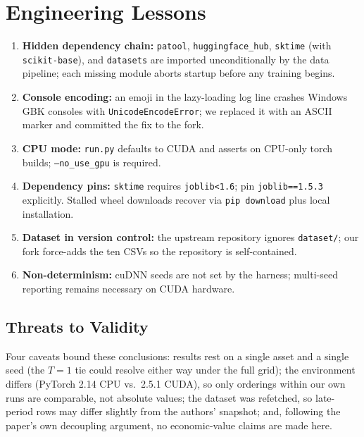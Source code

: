\documentclass[conference]{IEEEtran}
\begin{document}
\section{Engineering Lessons}
\label{sec:lessons}

\begin{enumerate}
  \item \textbf{Hidden dependency chain:} \texttt{patool},
        \texttt{huggingface\_hub}, \texttt{sktime} (with
        \texttt{scikit-base}), and \texttt{datasets} are imported
        unconditionally by the data pipeline; each missing module aborts
        startup before any training begins.
  \item \textbf{Console encoding:} an emoji in the lazy-loading log line
        crashes Windows GBK consoles with \texttt{UnicodeEncodeError}; we
        replaced it with an ASCII marker and committed the fix to the fork.
  \item \textbf{CPU mode:} \texttt{run.py} defaults to CUDA and asserts on
        CPU-only torch builds; \texttt{--no\_use\_gpu} is required.
  \item \textbf{Dependency pins:} \texttt{sktime} requires
        \texttt{joblib<1.6}; pin \texttt{joblib==1.5.3} explicitly. Stalled
        wheel downloads recover via \texttt{pip download} plus local
        installation.
  \item \textbf{Dataset in version control:} the upstream repository
        ignores \texttt{dataset/}; our fork force-adds the ten CSVs so the
        repository is self-contained.
  \item \textbf{Non-determinism:} cuDNN seeds are not set by the harness;
        multi-seed reporting remains necessary on CUDA hardware.
\end{enumerate}

\subsection{Threats to Validity}

Four caveats bound these conclusions: results rest on a single asset and a
single seed (the $T=1$ tie could resolve either way under the full grid);
the environment differs (PyTorch 2.14 CPU vs.\ 2.5.1 CUDA), so only
orderings within our own runs are comparable, not absolute values; the
dataset was refetched, so late-period rows may differ slightly from the
authors' snapshot; and, following the paper's own decoupling argument, no
economic-value claims are made here.
\end{document}
